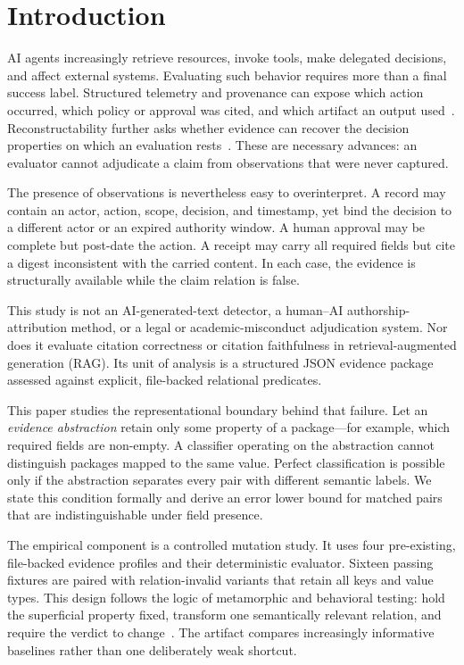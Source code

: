\documentclass[preprint,12pt]{elsarticle}
\begin{document}
\section{Introduction}

AI agents increasingly retrieve resources, invoke tools, make delegated decisions, and affect external systems. Evaluating such behavior requires more than a final success label. Structured telemetry and provenance can expose which action occurred, which policy or approval was cited, and which artifact an output used~\cite{alsayyad2026agenttrace,wang2026provenance,groth2013prov}. Reconstructability further asks whether evidence can recover the decision properties on which an evaluation rests~\cite{solozobov2026load}. These are necessary advances: an evaluator cannot adjudicate a claim from observations that were never captured.

The presence of observations is nevertheless easy to overinterpret. A record may contain an actor, action, scope, decision, and timestamp, yet bind the decision to a different actor or an expired authority window. A human approval may be complete but post-date the action. A receipt may carry all required fields but cite a digest inconsistent with the carried content. In each case, the evidence is structurally available while the claim relation is false.

This study is not an AI-generated-text detector, a human--AI authorship-attribution method, or a legal or academic-misconduct adjudication system. Nor does it evaluate citation correctness or citation faithfulness in retrieval-augmented generation (RAG). Its unit of analysis is a structured JSON evidence package assessed against explicit, file-backed relational predicates.

This paper studies the representational boundary behind that failure. Let an \emph{evidence abstraction} retain only some property of a package---for example, which required fields are non-empty. A classifier operating on the abstraction cannot distinguish packages mapped to the same value. Perfect classification is possible only if the abstraction separates every pair with different semantic labels. We state this condition formally and derive an error lower bound for matched pairs that are indistinguishable under field presence.

The empirical component is a controlled mutation study. It uses four pre-existing, file-backed evidence profiles and their deterministic evaluator. Sixteen passing fixtures are paired with relation-invalid variants that retain all keys and value types. This design follows the logic of metamorphic and behavioral testing: hold the superficial property fixed, transform one semantically relevant relation, and require the verdict to change~\cite{segura2016metamorphic,ribeiro2020checklist}. The artifact compares increasingly informative baselines rather than one deliberately weak shortcut.
\end{document}
